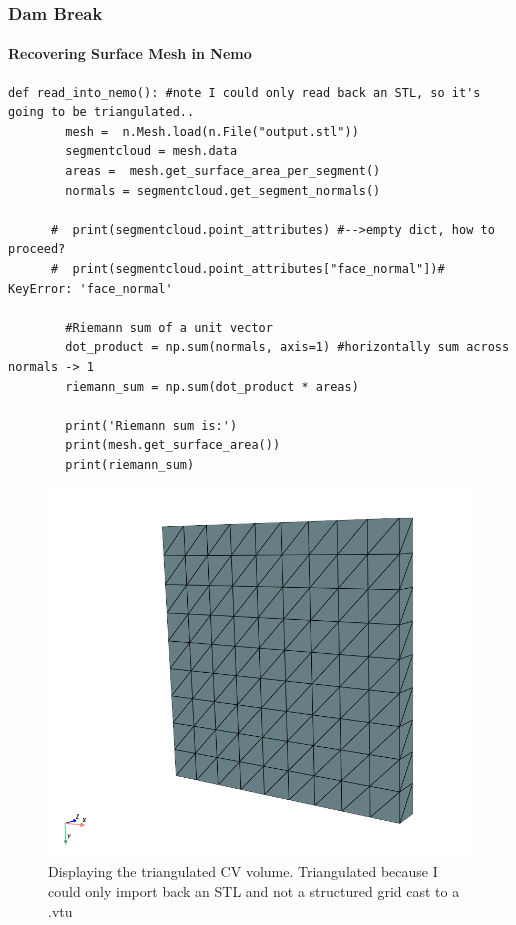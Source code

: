 \documentclass[notheorems, aspectratio=169]{beamer}
\begin{document}
  \begin{frame}[fragile]
    \frametitle{Dam Break}
    \framesubtitle{Recovering Surface Mesh in Nemo}
    
    \begin{lstlisting}[style = python]
    def read_into_nemo(): #note I could only read back an STL, so it's going to be triangulated..
        mesh =  n.Mesh.load(n.File("output.stl"))
        segmentcloud = mesh.data
        areas =  mesh.get_surface_area_per_segment()
        normals = segmentcloud.get_segment_normals()
  
      #  print(segmentcloud.point_attributes) #-->empty dict, how to proceed?
      #  print(segmentcloud.point_attributes["face_normal"])# KeyError: 'face_normal'
        
        #Riemann sum of a unit vector
        dot_product = np.sum(normals, axis=1) #horizontally sum across normals -> 1
        riemann_sum = np.sum(dot_product * areas)
      
        print('Riemann sum is:')
        print(mesh.get_surface_area())
        print(riemann_sum)
    \end{lstlisting}
    
  \end{frame}

  
  \begin{frame}

    
    \begin{figure}
      \centering
      \includegraphics[width=0.5\linewidth]{pictures/control_volume.png} 
      \caption{Displaying the triangulated CV volume. Triangulated because I could only import back an STL and not a structured grid cast to a .vtu}
    \end{figure}
  
  \end{frame}
  
\end{document}
